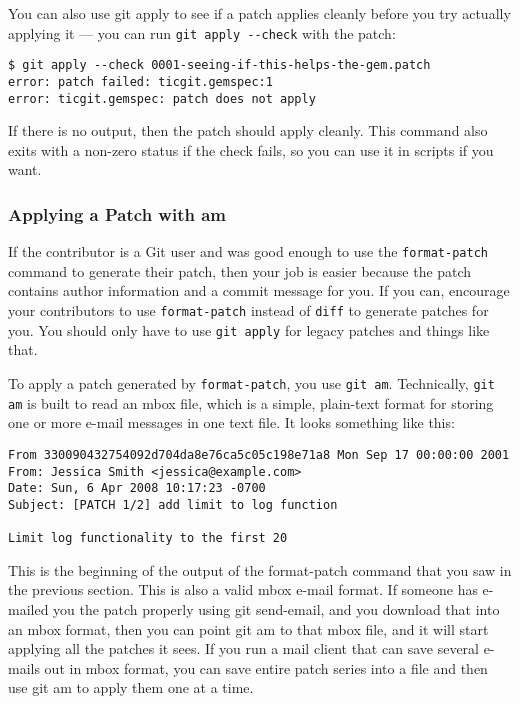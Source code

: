 \documentclass[a4paper]{book}
\begin{document}
You can also use git apply to see if a patch applies cleanly before you try actually applying it --- you can run \texttt{git apply -{}-check} with the patch:

\begin{shaded}\begin{verbatim}
$ git apply --check 0001-seeing-if-this-helps-the-gem.patch
error: patch failed: ticgit.gemspec:1
error: ticgit.gemspec: patch does not apply
\end{verbatim}\end{shaded}

If there is no output, then the patch should apply cleanly. This command also exits with a non-zero status if the check fails, so you can use it in scripts if you want.

\subsubsection{Applying a Patch with am}

If the contributor is a Git user and was good enough to use the \texttt{format-patch} command to generate their patch, then your job is easier because the patch contains author information and a commit message for you. If you can, encourage your contributors to use \texttt{format-patch} instead of \texttt{diff} to generate patches for you. You should only have to use \texttt{git apply} for legacy patches and things like that.

To apply a patch generated by \texttt{format-patch}, you use \texttt{git am}. Technically, \texttt{git am} is built to read an mbox file, which is a simple, plain-text format for storing one or more e-mail messages in one text file. It looks something like this:

\begin{shaded}\begin{verbatim}
From 330090432754092d704da8e76ca5c05c198e71a8 Mon Sep 17 00:00:00 2001
From: Jessica Smith <jessica@example.com>
Date: Sun, 6 Apr 2008 10:17:23 -0700
Subject: [PATCH 1/2] add limit to log function

Limit log functionality to the first 20
\end{verbatim}\end{shaded}

This is the beginning of the output of the format-patch command that you saw in the previous section. This is also a valid mbox e-mail format. If someone has e-mailed you the patch properly using git send-email, and you download that into an mbox format, then you can point git am to that mbox file, and it will start applying all the patches it sees. If you run a mail client that can save several e-mails out in mbox format, you can save entire patch series into a file and then use git am to apply them one at a time.
\end{document}
